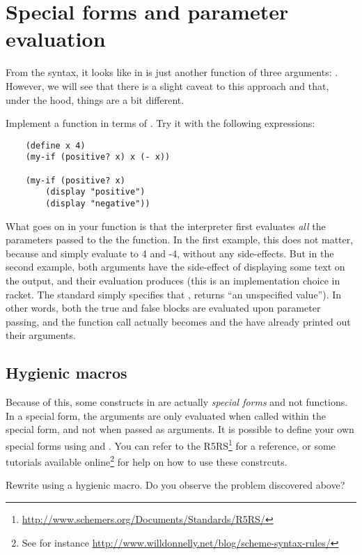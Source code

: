\documentclass{../../../tp}
\begin{document}
\section{Special forms and parameter evaluation}

From the syntax, it looks like  in \scheme is just another function of three arguments: . However, we will see that there is a slight caveat to this approach and that, under the hood, things are a bit different.

\begin{instruction}
	Implement a  function in terms of . Try it with the following expressions:
	
	\begin{verbatim}
	(define x 4)
	(my-if (positive? x) x (- x))
	
	(my-if (positive? x) 
		(display "positive") 
		(display "negative"))
	\end{verbatim}
\end{instruction}

What goes on in your  function is that the interpreter first evaluates \emph{all} the parameters passed to the the function. In the first example, this does not matter, because  and  simply evaluate to 4 and -4, without any side-effects. But in the second example, both arguments have the side-effect of displaying some text on the output, and their evaluation produces  (this is an implementation choice in racket. The standard simply specifies that , returns ``an unspecified value''). In other words, both the true and false blocks are evaluated upon parameter passing, and the function call actually becomes  and the  have already printed out their arguments.  

\subsection{Hygienic macros}

Because of this, some constructs in \scheme are actually \emph{special forms} and not functions. In a special form, the arguments are only evaluated when called within the special form, and not when passed as arguments. It is possible to define your own special forms using  and . You can refer to the R5RS\footnote{\url{http://www.schemers.org/Documents/Standards/R5RS/}} for a reference, or some tutorials available online\footnote{See for instance \url{http://www.willdonnelly.net/blog/scheme-syntax-rules/}} for help on how to use these constrcuts.

\begin{instruction}
Rewrite  using a hygienic macro. Do you observe the problem discovered above? 	
\end{instruction}
\end{document}

